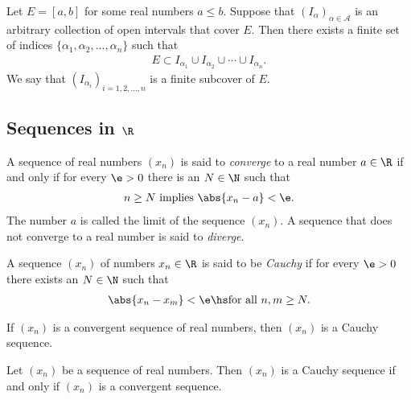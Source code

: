 \documentclass{article}
\begin{document}
\begin{theorem}[Notes 1.2]
    Let $E=[a,b]$ for some real numbers $a\leq b$. Suppose that $(I_\alpha)_{\alpha\in\mathcal{A}}$
    is an arbitrary collection of open intervals that cover $E$. Then there exists a finite
    set of indices $\{\alpha_1, \alpha_2, ..., \alpha_n\}$ such that 
    \begin{align*}
        E \subset I_{\alpha_1} \cup I_{\alpha_2}\cup \cdots \cup I_{\alpha_n}.
    \end{align*}
    We say that $(I_{\alpha_i})_{i=1,2,...,n}$ is a finite subcover of $E$.
\end{theorem}

\subsection{Sequences in $\R$}

\begin{definition}[Notes 1.2]
    A sequence of real numbers $(x_n)$ is said to \emph{converge} to a real number
    $a\in\R$ if and only if for every $\e>0$ there is an $N\in\N$ such that
    \begin{align*}
        n\geq N \text{ implies } \abs{x_n-a} < \e.
    \end{align*} 
    The number $a$ is called the limit of the sequence $(x_n)$. A sequence that
    does not converge to a real number is said to \emph{diverge}.
\end{definition}

\begin{definition}[Notes 1.3]
    A sequence $(x_n)$ of numbers $x_n\in\R$ is said to be \emph{Cauchy} if for every $\e>0$ there
    exists an $N\in\N$ such that
    \begin{align*}
        \abs{x_n-x_m}<\e \hs \text{for all }n,m\geq N. 
    \end{align*}
\end{definition}

\begin{theorem}[Notes 1.3]
    If $(x_n)$ is a convergent sequence of real numbers, then $(x_n)$ is a Cauchy sequence.
\end{theorem}

\begin{theorem}
    Let $(x_n)$ be a sequence of real numbers. Then $(x_n)$ is a Cauchy sequence if and only
    if $(x_n)$ is a convergent sequence. 
\end{theorem}
\end{document}
